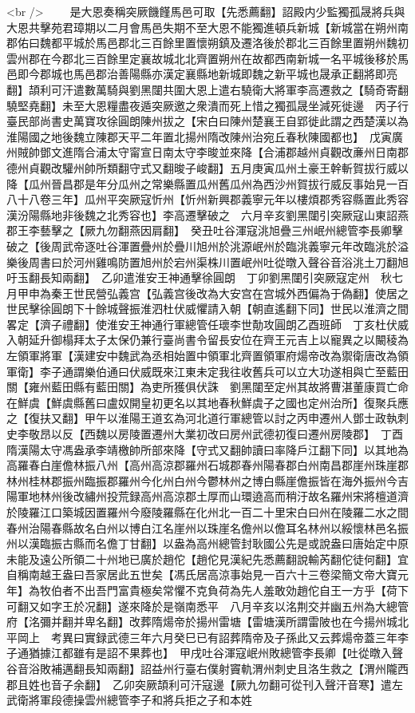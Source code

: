 <br />
　　是大恩奏稱突厥饑饉馬邑可取【先悉薦翻】詔殿内少監獨孤晟將兵與大恩共擊苑君璋期以二月會馬邑失期不至大恩不能獨進頓兵新城【新城當在朔州南郡佑曰魏都平城於馬邑郡北三百餘里置懷朔鎮及遷洛後於郡北三百餘里置朔州魏初雲州郡在今郡北三百餘里定襄故城北北齊置朔州在故都西南新城一名平城後移於馬邑即今郡城也馬邑郡治善陽縣亦漢定襄縣地新城即魏之新平城也晟承正翻將即亮翻】頡利可汗遣數萬騎與劉黑闥共圍大恩上遣右驍衛大將軍李高遷救之【騎奇寄翻驍堅堯翻】未至大恩糧盡夜遁突厥邀之衆潰而死上惜之獨孤晟坐減死徙邊　丙子行臺民部尚書史萬寶攻徐圓朗陳州拔之【宋白曰陳州楚襄王自郢徙此謂之西楚漢以為淮陽國之地後魏立陳郡天平二年置北揚州隋改陳州治宛丘春秋陳國都也】　戊寅廣州賊帥鄧文進隋合浦太守甯宣日南太守李晙並來降【合浦郡越州貞觀改亷州日南郡德州貞觀改驩州帥所類翻守式又翻晙子峻翻】五月庚寅瓜州土豪王幹斬賀拔行威以降【瓜州晉昌郡是年分瓜州之常樂縣置瓜州舊瓜州為西沙州賀拔行威反事始見一百八十八卷三年】瓜州平突厥寇忻州【忻州新興郡義寧元年以樓煩郡秀容縣置此秀容漢汾陽縣地非後魏之北秀容也】李高遷擊破之　六月辛亥劉黑闥引突厥寇山東詔燕郡王李藝擊之【厥九勿翻燕因肩翻】　癸丑吐谷渾寇洮旭疊三州岷州總管李長卿擊破之【後周武帝逐吐谷渾置疊州於疊川旭州於洮源岷州於臨洮義寧元年改臨洮於溢樂後周書曰於河州雞鳴防置旭州於宕州渠株川置岷州吐從暾入聲谷音浴洮土刀翻旭吁玉翻長知兩翻】　乙卯遣淮安王神通擊徐圓朗　丁卯劉黑闥引突厥寇定州　秋七月甲申為秦王世民營弘義宫【弘義宫後改為大安宫在宫城外西偏為于偽翻】使居之世民擊徐圓朗下十餘城聲振淮泗杜伏威懼請入朝【朝直遙翻下同】世民以淮濟之間畧定【濟子禮翻】使淮安王神通行軍總管任瓌李世勣攻圓朗乙酉班師　丁亥杜伏威入朝延升御榻拜太子太保仍兼行臺尚書令留長安位在齊王元吉上以寵異之以闞稜為左領軍將軍【漢建安中魏武為丞相始置中領軍北齊置領軍府煬帝改為禦衛唐改為領軍衛】李子通謂樂伯通曰伏威既來江東未定我往收舊兵可以立大功遂相與亡至藍田關【雍州藍田縣有藍田關】為吏所獲俱伏誅　劉黑闥至定州其故將曹湛董康買亡命在鮮虞【鮮虞縣舊曰盧奴開皇初更名以其地春秋鮮虞子之國也定州治所】復聚兵應之【復扶又翻】甲午以淮陽王道玄為河北道行軍總管以討之丙申遷州人鄧士政執刺史李敬昂以反【西魏以房陵置遷州大業初改曰房州武德初復曰遷州房陵郡】　丁酉隋漢陽太守馮盎承李靖檄帥所部來降【守式又翻帥讀曰率降戶江翻下同】以其地為高羅春白崖儋林振八州【高州高涼郡羅州石城郡春州陽春郡白州南昌郡崖州珠崖郡林州桂林郡振州臨振郡羅州今化州白州今鬱林州之博白縣崖儋振皆在海外振州今吉陽軍地林州後改繡州投荒録高州高涼郡土厚而山環遶高而稍汙故名羅州宋將檀道濟於陵羅江口築城因置羅州今廢陵羅縣在化州北一百二十里宋白曰州在陵羅二水之間春州治陽春縣故名白州以博白江名崖州以珠崖名儋州以儋耳名林州以綏懷林邑名振州以漢臨振古縣而名儋丁甘翻】以盎為高州總管封耿國公先是或說盎曰唐始定中原未能及遠公所領二十州地已廣於趙佗【趙佗見漢紀先悉薦翻說輸芮翻佗徒何翻】宜自稱南越王盎曰吾家居此五世矣【馮氏居高涼事始見一百六十三卷梁簡文帝大寶元年】為牧伯者不出吾門富貴極矣常懼不克負荷為先人羞敢効趙佗自王一方乎【荷下可翻又如字王於况翻】遂來降於是嶺南悉平　八月辛亥以洺荆交并幽五州為大總管府【洺彌并翻并卑名翻】改葬隋煬帝於揚州雷塘【雷塘漢所謂雷陂也在今揚州城北平岡上　考異曰實録武德三年六月癸巳已有詔葬隋帝及子孫此又云葬煬帝蓋三年李子通猶據江都雖有是詔不果葬也】　甲戌吐谷渾寇岷州敗總管李長卿【吐從暾入聲谷音浴敗補邁翻長知兩翻】詔益州行臺右僕射竇軌渭州刺史且洛生救之【渭州隴西郡且姓也音子余翻】　乙卯突厥頡利可汗寇邊【厥九勿翻可從刊入聲汗音寒】遣左武衛將軍段德操雲州總管李子和將兵拒之子和本姓